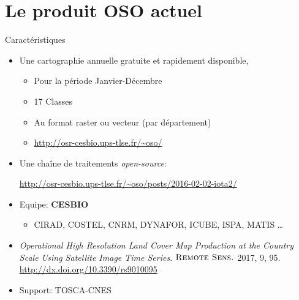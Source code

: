 \documentclass[pressentation,10pt,aspectratio=1610, xcolor=table]{beamer}
\begin{document}
\section{Le produit OSO actuel}
\label{sec:org479d0d1}
\begin{frame}[label={sec:org8188c30}]{Caractéristiques}
\begin{itemize}
\item Une cartographie annuelle gratuite et rapidement disponible,
\begin{itemize}
\item Pour la période \og Janvier-Décembre\fg
\item 17 Classes
\item Au format raster ou vecteur (par département)
\item \url{http://osr-cesbio.ups-tlse.fr/\~oso/}
\end{itemize}
\item Une chaîne de traitements \emph{open-source}:
\begin{center}
\url{http://osr-cesbio.ups-tlse.fr/\~oso/posts/2016-02-02-iota2/} 
\end{center}
\item Equipe: \textbf{CESBIO}
\begin{itemize}
\item CIRAD, COSTEL, CNRM, DYNAFOR, ICUBE, ISPA, MATIS \ldots{}
\end{itemize}
\item \emph{Operational High Resolution Land Cover Map Production at the Country
Scale Using Satellite Image  Time Series}.  \(\textsc{Remote Sens.}\)
2017, 9, 95. \url{http://dx.doi.org/10.3390/rs9010095}
\item Support: TOSCA-CNES
\end{itemize}
\end{frame}
\end{document}
